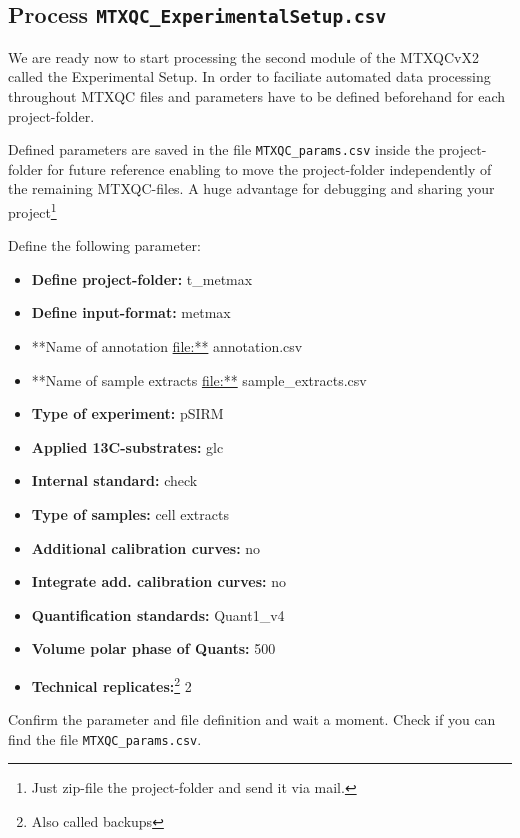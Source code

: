\documentclass[]{book}
\providecommand{\tightlist}{%
  \setlength{\itemsep}{0pt}\setlength{\parskip}{0pt}}
\let\rmarkdownfootnote\footnote%
\def\footnote{\protect\rmarkdownfootnote}
\theoremstyle{definition}
\theoremstyle{definition}
\theoremstyle{definition}
\theoremstyle{remark}
\begin{document}
\subsection{\texorpdfstring{Process
\texttt{MTXQC\_ExperimentalSetup.csv}}{Process MTXQC\_ExperimentalSetup.csv}}\label{process-mtxqc_experimentalsetup.csv-1}

We are ready now to start processing the second module of the MTXQCvX2
called the Experimental Setup. In order to faciliate automated data
processing throughout MTXQC files and parameters have to be defined
beforehand for each project-folder.

Defined parameters are saved in the file \texttt{MTXQC\_params.csv}
inside the project-folder for future reference enabling to move the
project-folder independently of the remaining MTXQC-files. A huge
advantage for debugging and sharing your project\footnote{Just zip-file
  the project-folder and send it via mail.}

Define the following parameter:

\begin{itemize}
\tightlist
\item
  \textbf{Define project-folder:} t\_metmax
\item
  \textbf{Define input-format:} metmax
\item
  **Name of annotation \url{file:**} annotation.csv
\item
  **Name of sample extracts \url{file:**} sample\_extracts.csv
\item
  \textbf{Type of experiment:} pSIRM
\item
  \textbf{Applied 13C-substrates:} glc
\item
  \textbf{Internal standard:} check
\item
  \textbf{Type of samples:} cell extracts
\item
  \textbf{Additional calibration curves:} no
\item
  \textbf{Integrate add. calibration curves:} no
\item
  \textbf{Quantification standards:} Quant1\_v4
\item
  \textbf{Volume polar phase of Quants:} 500
\item
  \textbf{Technical replicates:}\footnote{Also called backups} 2
\end{itemize}

Confirm the parameter and file definition and wait a moment. Check if
you can find the file \texttt{MTXQC\_params.csv}.
\end{document}
